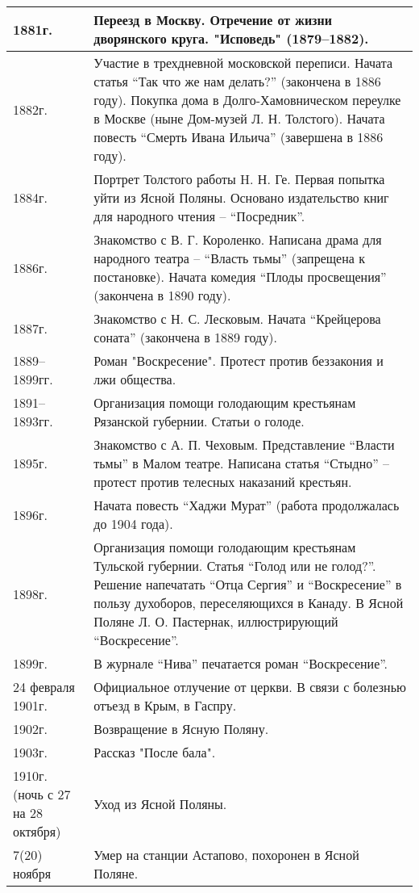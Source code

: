 \documentclass{article}
\begin{document}
\begin{longtable}[c]{|p{3cm}|p{8cm}|}
  \hline
  1881г. & Переезд в Москву. Отречение от жизни дворянского круга. "Исповедь" (1879–1882).\\
  \hline
  1882г. & Участие в трехдневной московской переписи.
  Начата статья ``Так что же нам делать?'' (закончена в 1886 году).
  Покупка дома в Долго-Хамовническом переулке в Москве (ныне Дом-музей Л. Н. Толстого).
  Начата повесть ``Смерть Ивана Ильича'' (завершена в 1886 году).\\
  \hline
  1884г. & Портрет Толстого работы H. Н. Ге.
  Первая попытка уйти из Ясной Поляны. Основано издательство книг для народного чтения – ``Посредник''.\\
  \hline
  1886г. & Знакомство с В. Г. Короленко.
  Написана драма для народного театра – ``Власть тьмы'' (запрещена к постановке).
  Начата комедия ``Плоды просвещения'' (закончена в 1890 году).\\
  \hline
  1887г. & Знакомство с Н. С. Лесковым.
  Начата ``Крейцерова соната'' (закончена в 1889 году).\\
  \hline
  1889–1899гг. & Роман "Воскресение". Протест против беззакония и лжи общества.\\
  \hline
  1891–1893гг. & Организация помощи голодающим крестьянам Рязанской губернии. Статьи о голоде.\\
  \hline
  1895г. & Знакомство с А. П. Чеховым. Представление ``Власти тьмы'' в Малом театре.
  Написана статья ``Стыдно'' – протест против телесных наказаний крестьян.\\
  \hline
  1896г. & Начата повесть ``Хаджи Мурат'' (работа продолжалась до 1904 года).\\
  \hline
  1898г. & Организация помощи голодающим крестьянам Тульской губернии. Статья ``Голод или не голод?''.
  Решение напечатать ``Отца Сергия'' и ``Воскресение'' в пользу духоборов, переселяющихся в Канаду.
  В Ясной Поляне Л. О. Пастернак, иллюстрирующий ``Воскресение''.\\
  \hline
  1899г. & В журнале ``Нива'' печатается роман ``Воскресение''.\\
  \hline
  24 февраля 1901г. & Официальное отлучение от церкви. В связи с болезнью отъезд в Крым, в Гаспру.\\
  \hline
  1902г. & Возвращение в Ясную Поляну.\\
  \hline
  1903г. & Рассказ "После бала".\\
  \hline
  1910г. (ночь с 27 на 28 октября)  & Уход из Ясной Поляны.\\
  \hline
  7(20) ноября & Умер на станции Астапово, похоронен в Ясной Поляне.\\
  \bottomrule
\end{longtable}
\end{document}
